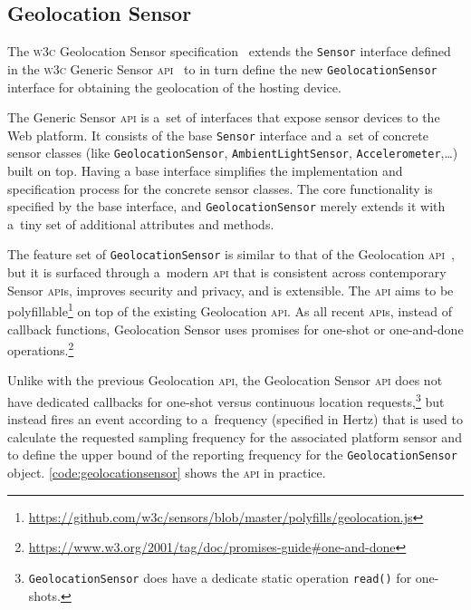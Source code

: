 \documentclass[sigconf,hyphens]{acmart}
\begin{document}
\subsection{Geolocation Sensor}

The \textsc{w3c} Geolocation Sensor specification~\cite{kostiainen2018geolocation}
extends the \texttt{Sensor} interface defined in the
\textsc{w3c} Generic Sensor \textsc{api}~\cite{waldron2018genericsensor}
to in turn define the new \texttt{GeolocationSensor} interface
for obtaining the geolocation of the hosting device.

The Generic Sensor \textsc{api} is a~set of interfaces that expose sensor devices to the Web platform.
It consists of the base \texttt{Sensor} interface and a~set of concrete sensor classes
(like \texttt{GeolocationSensor}, \texttt{AmbientLightSensor}, \texttt{Accelerometer},\ldots) built on top.
Having a base interface simplifies the implementation and specification process for the concrete sensor classes.
The core functionality is specified by the base interface, and \texttt{GeolocationSensor}
merely extends it with a~tiny set of additional attributes and methods.

The feature set of \texttt{GeolocationSensor} is similar
to that of the Geolocation \textsc{api}~\cite{raskin2010geolocation},
but it is surfaced through a~modern \textsc{api} that is consistent across contemporary Sensor \textsc{api}s,
improves security and privacy, and is extensible.
The \textsc{api} aims to be
polyfillable\footnote{\url{https://github.com/w3c/sensors/blob/master/polyfills/geolocation.js}}
on top of the existing Geolocation \textsc{api}.
As all recent \textsc{api}s, instead of callback functions, Geolocation Sensor
uses promises for one-shot or one-and-done
operations.\footnote{\url{https://www.w3.org/2001/tag/doc/promises-guide\#one-and-done}}

Unlike with the previous Geolocation \textsc{api}, the Geolocation Sensor \textsc{api}
does not have dedicated callbacks for
one-shot versus continuous location
requests,\footnote{\texttt{GeolocationSensor} does have a dedicate static operation
\texttt{read()} for one-shots.}
but instead fires an event according to a~frequency (specified in Hertz) that is used
to calculate the requested sampling frequency for the associated platform sensor
and to define the upper bound of the reporting frequency for the \texttt{GeolocationSensor}
object.
\autoref{code:geolocationsensor} shows the \textsc{api} in practice.
\end{document}
